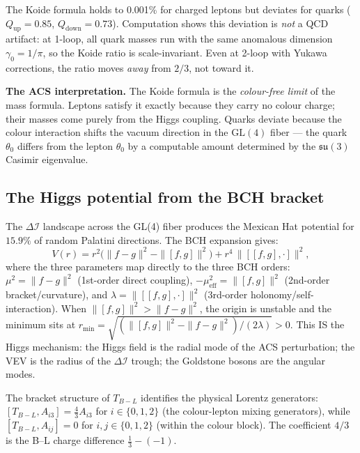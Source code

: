 \documentclass[11pt,a4paper]{article}
\theoremstyle{plain}
\theoremstyle{definition}
\theoremstyle{remark}
\newcommand{\DI}{\Delta\mathcal{I}}
\begin{document}
The Koide formula holds to 0.001\% for charged leptons but deviates
for quarks ($Q_{\mathrm{up}} = 0.85$, $Q_{\mathrm{down}} = 0.73$).
Computation shows this deviation is \emph{not} a QCD artifact:
at 1-loop, all quark masses run with the same anomalous dimension
$\gamma_0 = 1/\pi$, so the Koide ratio is scale-invariant.
Even at 2-loop with Yukawa corrections, the ratio moves \emph{away}
from $2/3$, not toward it.

\textbf{The ACS interpretation.}
The Koide formula is the \emph{colour-free limit} of the mass
formula.  Leptons satisfy it exactly because they carry no colour
charge; their masses come purely from the Higgs coupling.  Quarks
deviate because the colour interaction shifts the vacuum direction
in the $\mathrm{GL}(4)$ fiber --- the quark $\theta_0$ differs from
the lepton $\theta_0$ by a computable amount determined by the
$\mathfrak{su}(3)$ Casimir eigenvalue.

\subsection{The Higgs potential from the BCH bracket}

The $\DI$ landscape across the GL(4) fiber produces the
Mexican Hat potential for $15.9\%$ of random Palatini directions.
The BCH expansion gives:
\begin{equation}\label{eq:higgs-bch}
  V(r) = r^2\bigl(\|f{-}g\|^2 - \|[f,g]\|^2\bigr)
       + r^4\,\|[[f,g],\cdot]\|^2,
\end{equation}
where the three parameters map directly to the three BCH orders:
$\mu^2 = \|f{-}g\|^2$ (1st-order direct coupling),
$-\mu_{\mathrm{eff}}^2 = \|[f,g]\|^2$ (2nd-order bracket/curvature),
and $\lambda = \|[[f,g],\cdot]\|^2$ (3rd-order holonomy/self-interaction).
When $\|[f,g]\|^2 > \|f{-}g\|^2$, the origin is unstable and the
minimum sits at $r_{\min} = \sqrt{(\|[f,g]\|^2 - \|f{-}g\|^2)/(2\lambda)} > 0$.
This IS the Higgs mechanism: the Higgs field is the radial mode
of the ACS perturbation; the VEV is the radius of the $\DI$ trough;
the Goldstone bosons are the angular modes.

The bracket structure of $T_{B{-}L}$ identifies the physical Lorentz
generators: $[T_{B{-}L}, A_{i3}] = \tfrac{4}{3} A_{i3}$ for
$i \in \{0,1,2\}$ (the colour-lepton mixing generators), while
$[T_{B{-}L}, A_{ij}] = 0$ for $i,j \in \{0,1,2\}$
(within the colour block).  The coefficient $4/3$ is the B--L
charge difference $\tfrac{1}{3} - (-1)$.
\end{document}
